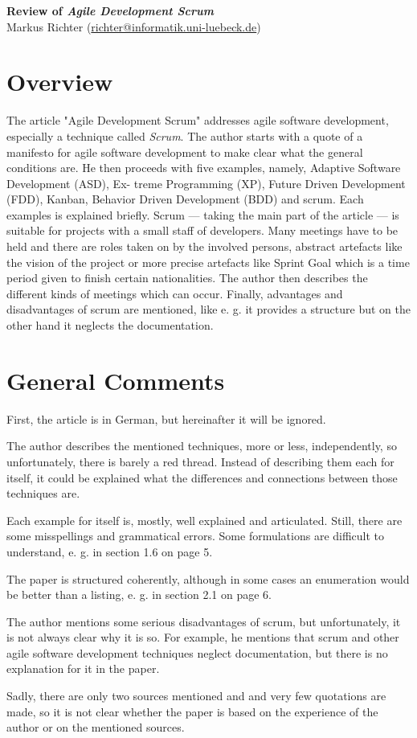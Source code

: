 \documentclass[
  a4paper,               %
  twoside,               %
  headings=small,        %
  DIV=12,                %
  BCOR=1cm,              %
  headinclude=true,      %
  footinclude=true,      %
  numbers=noenddot,      %
  11pt]{scrartcl}        %
\begin{document}
\begin{center}
\textbf{\huge Review of \emph{Agile Development Scrum}} \\[1em]
Markus Richter (\url{richter@informatik.uni-luebeck.de})
\end{center}


\section*{Overview}
The article "Agile Development Scrum" addresses agile software development, especially a technique called \emph{Scrum}. The author starts with a quote of a manifesto for agile software development to make clear what the general conditions are. He then proceeds with five examples, namely, Adaptive Software Development (ASD), Ex-
treme Programming (XP), Future Driven Development (FDD), Kanban, Behavior
Driven Development (BDD) and scrum. Each examples is explained briefly. Scrum --- taking the main part of the article --- is suitable for projects with a small staff of developers. Many meetings have to be held and there are roles taken on by the involved persons, abstract artefacts like the vision of the project or more precise artefacts like Sprint Goal which is a time period given to finish certain nationalities. The author then describes the different kinds of meetings which can occur. Finally, advantages and disadvantages of scrum are mentioned, like e. g. it provides a structure but on the other hand it neglects the documentation. 

\section*{General Comments}
First, the article is in German, but hereinafter it will be ignored. 

The author describes the mentioned techniques, more or less, independently, so unfortunately, there is barely a red thread. Instead of describing them each for itself, it could be explained what the differences and connections between those techniques are. 

Each example for itself is, mostly, well explained and articulated. Still, there are some misspellings and grammatical errors. Some formulations are difficult to understand, e. g. in section 1.6 on page 5. 

The paper is structured coherently, although in some cases an enumeration would be better than a listing, e. g. in section 2.1 on page 6. 

The author mentions some serious disadvantages of scrum, but unfortunately, it is not always clear why it is so. For example, he mentions that scrum and other agile software development techniques neglect documentation, but there is no explanation for it in the paper.  

Sadly, there are only two sources mentioned and and very few quotations are made, so it is not clear whether the paper is based on the experience of the author or on the mentioned sources. 
\end{document}
